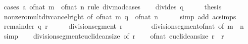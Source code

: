 \begin{isabellebody}
%
\isadelimproof
%
\endisadelimproof
%
\isatagproof
{}\isamarkupfalse%
\ {\isacharparenleft}{\kern0pt}cases\ a\ {\isachardoublequoteopen}of{\isacharunderscore}{\kern0pt}nat\ m\ {\isacharasterisk}{\kern0pt}\ of{\isacharunderscore}{\kern0pt}nat\ n{\isachardoublequoteclose}\ rule{\isacharcolon}{\kern0pt}\ divmod{\isacharunderscore}{\kern0pt}cases{\isacharparenright}{\kern0pt}\isanewline
\ \ \isamarkupfalse%
\ {\isacharparenleft}{\kern0pt}divides\ q{\isacharparenright}{\kern0pt}\isanewline
\ \ \isamarkupfalse%
\ \isamarkupfalse%
\ {\isacharquery}{\kern0pt}thesis\isanewline
\ \ \ \ \isamarkupfalse%
\ nonzero{\isacharunderscore}{\kern0pt}mult{\isacharunderscore}{\kern0pt}div{\isacharunderscore}{\kern0pt}cancel{\isacharunderscore}{\kern0pt}right\ {\isacharbrackleft}{\kern0pt}of\ {\isachardoublequoteopen}of{\isacharunderscore}{\kern0pt}nat\ m{\isachardoublequoteclose}\ {\isachardoublequoteopen}q\ {\isacharasterisk}{\kern0pt}\ of{\isacharunderscore}{\kern0pt}nat\ n{\isachardoublequoteclose}{\isacharbrackright}{\kern0pt}\isanewline
\ \ \ \ \isamarkupfalse%
\ {\isacharparenleft}{\kern0pt}simp\ add{\isacharcolon}{\kern0pt}\ ac{\isacharunderscore}{\kern0pt}simps{\isacharparenright}{\kern0pt}\isanewline
{}\isamarkupfalse%
\isanewline
\ \ \isamarkupfalse%
\ {\isacharparenleft}{\kern0pt}remainder\ q\ r{\isacharparenright}{\kern0pt}\isanewline
\ \ \isamarkupfalse%
\ \isamarkupfalse%
\ {\isachardoublequoteopen}division{\isacharunderscore}{\kern0pt}segment\ r\ {\isacharequal}{\kern0pt}\ {}{\isachardoublequoteclose}\isanewline
\ \ \ \ \isamarkupfalse%
\ division{\isacharunderscore}{\kern0pt}segment{\isacharunderscore}{\kern0pt}of{\isacharunderscore}{\kern0pt}nat\ {\isacharbrackleft}{\kern0pt}of\ {\isachardoublequoteopen}m\ {\isacharasterisk}{\kern0pt}\ n{\isachardoublequoteclose}{\isacharbrackright}{\kern0pt}\ \isamarkupfalse%
\ simp\isanewline
\ \ \isamarkupfalse%
\ division{\isacharunderscore}{\kern0pt}segment{\isacharunderscore}{\kern0pt}euclidean{\isacharunderscore}{\kern0pt}size\ {\isacharbrackleft}{\kern0pt}of\ r{\isacharbrackright}{\kern0pt}\isanewline
\ \ \isamarkupfalse%
\ {\isachardoublequoteopen}of{\isacharunderscore}{\kern0pt}nat\ {\isacharparenleft}{\kern0pt}euclidean{\isacharunderscore}{\kern0pt}size\ r{\isacharparenright}{\kern0pt}\ {\isacharequal}{\kern0pt}\ r{\isachardoublequoteclose}\isanewline
\ \ \ \ \isamarkupfalse%

\end{isabellebody}

